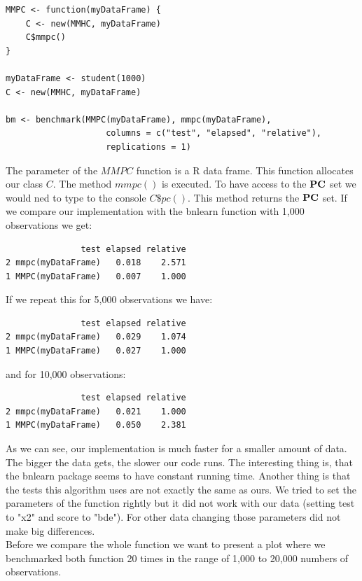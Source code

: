  	\begin{verbatim}
MMPC <- function(myDataFrame) {
    C <- new(MMHC, myDataFrame)
    C$mmpc()
}

myDataFrame <- student(1000)
C <- new(MMHC, myDataFrame)

bm <- benchmark(MMPC(myDataFrame), mmpc(myDataFrame),
                    columns = c("test", "elapsed", "relative"),
                    replications = 1)
 	\end{verbatim}

 	The parameter of the $MMPC$ function is a R data frame. This function allocates our class $C$. The method $mmpc()$ is executed. To have access to the ${\textbf{PC}}$ set we would ned to type to the console $C\$pc()$. This method returns the ${\textbf{PC}}$ set. If we compare our implementation with the bnlearn function with 1,000 observations we get:
	\begin{verbatim}
               test elapsed relative
2 mmpc(myDataFrame)   0.018    2.571
1 MMPC(myDataFrame)   0.007    1.000
	\end{verbatim}

	If we repeat this for 5,000 observations we have:

	\begin{verbatim}
               test elapsed relative
2 mmpc(myDataFrame)   0.029    1.074
1 MMPC(myDataFrame)   0.027    1.000
	\end{verbatim}

	and for 10,000 observations:

	\begin{verbatim}
               test elapsed relative
2 mmpc(myDataFrame)   0.021    1.000
1 MMPC(myDataFrame)   0.050    2.381
	\end{verbatim}

	As we can see, our implementation is much faster for a smaller amount of data. The bigger the data gets, the slower our code runs. The interesting thing is, that the bnlearn package seems to have constant running time. Another thing is that the tests this algorithm uses are not exactly the same as ours. We tried to set the parameters of the function rightly but it did not work with our data (setting test to "x2" and score to "bde"). For other data changing those parameters did not make big differences.\\%
	Before we compare the whole function we want to present a plot where we benchmarked both function 20 times in the range of 1,000 to 20,000 numbers of observations.

